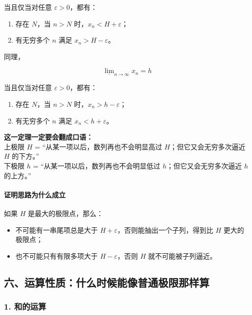 当且仅当对任意 \(\varepsilon>0\)，都有：

\begin{enumerate}
 \item 存在 \(N\)，当 \(n>N\) 时，\(x_n<H+\varepsilon\)；
 \item 有无穷多个 \(n\) 满足 \(x_n>H-\varepsilon\)。
 \end{enumerate}

同理，

\[
      \underline{\lim}_{n\to\infty}x_n=h
    \]

当且仅当对任意 \(\varepsilon>0\)，都有：

\begin{enumerate}
 \item 存在 \(N\)，当 \(n>N\) 时，\(x_n>h-\varepsilon\)；
 \item 有无穷多个 \(n\) 满足 \(x_n<h+\varepsilon\)。
 \end{enumerate}

\begin{notebox}
\textbf{这一定理一定要会翻成口语：}\\  上极限 \(H\) = “从某一项以后，数列再也不会明显高过 \(H\)；但它又会无穷多次逼近 \(H\) 的下方。”\\  下极限 \(h\) = “从某一项以后，数列再也不会明显低过 \(h\)；但它又会无穷多次逼近 \(h\) 的上方。”
\end{notebox}

\paragraph*{证明思路为什么成立}

如果 \(H\) 是最大的极限点，那么：

\begin{itemize}
 \item 不可能有一串尾项总是大于 \(H+\varepsilon\)，否则能抽出一个子列，得到比 \(H\) 更大的极限点；
 \item 也不可能只有有限多项大于 \(H-\varepsilon\)，否则 \(H\) 就不可能被子列逼近。
 \end{itemize}

\subsection*{六、运算性质：什么时候能像普通极限那样算}

\subsubsection*{1. 和的运算}

